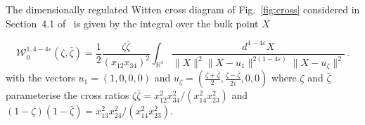 \documentclass[a4paper,12pt]{article}
\numberwithin{equation}{section}
\numberwithin{figure}{section}
\begin{document}
\begin{comment}
 \begin{figure}[ht]
                \centering
                \begin{tikzpicture}[baseline=(z)]
                        \begin{feynman}[inline=(z)]
                                \tikzfeynmanset{every vertex=dot}
                                \vertex (z);
                                \vertex [above left=0.71cm and 0.71cm of z, label=180:$x_2$] (x2);
                                \vertex [below left=0.71cm and 0.71cm of z, label=180:$x_1$] (x1);
                                \vertex [above right=0.71cm and 0.71cm of z, label=0:$x_3$] (x3);
                                \vertex [below right=0.71cm and 0.71cm of z, label=0:$x_4$] (x4);
                                \tikzfeynmanset{every vertex={empty dot,minimum size=0mm}}
                                \diagram* {
                                        (x2)--(z),
                                        (x1)--(z),
                                        (x3)--(z),
                                        (x4)--(z),
                                };
                        \end{feynman}
                        \begin{pgfonlayer}{bg}
                                \draw[blue] (z) circle (1cm);
                        \end{pgfonlayer}
                \end{tikzpicture}
                \caption{Witten Cross diagram, between four states on
                  boundary of $dS_4$. }
                \label{fig:cross}
        \end{figure}

\end{comment}
The dimensionally regulated Witten cross diagram of Fig.~\ref{fig:cross} considered in
Section~4.1 of~\cite{Heckelbacher:2022fbx} is given by the integral
over the bulk point $X$

\begin{equation}
       \mathcal{ W}_0^{1,4-4\varepsilon}(\zeta,\bar\zeta)=\frac12\frac{\zeta\bar\zeta}{(x_{12}x_{34})^2}\int_{\mathbb{R}^4}\frac{d^{4-4\varepsilon}X}{\|X\|^2\|X-u_1\|^{2(1-4\varepsilon)}\|X-u_{\zeta}\|^2}\,.
\end{equation}
with the vectors  $u_1=(1,0,0,0)$ and 
$u_{\zeta}=\left(\frac{\zeta+\bar\zeta}{2},\frac{\zeta-\bar\zeta}{2i},0,0\right)$ where $\zeta$  and $\bar\zeta$ parameterise the cross ratios $\zeta\bar\zeta=x_{12}^2x_{34}^2/(x_{14}^2x_{23}^2)$ and
  $(1-\zeta)(1-\bar\zeta)=x_{13}^2x_{24}^2 /(x_{14}^2 x_{23}^2)$.
\end{document}

